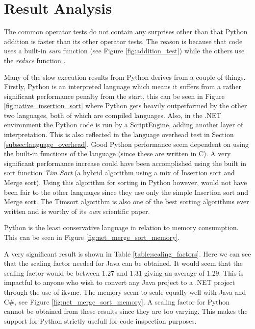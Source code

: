 \section{Result Analysis}

The common operator tests do not contain any surprises other than that Python addition is faster than its other operator tests. The reason is because that code uses a built-in \textit{sum} function \cite{PythonSum} (see Figure \ref{fig:addition_test}) while the others use the \textit{reduce} function \cite{PythonReduce}.

Many of the slow execution results from Python derives from a couple of things. Firstly, Python is an interpreted language which means it suffers from a rather significant performance penalty from the start, this can be seen in Figure \ref{fig:native_insertion_sort} where Python gets heavily outperformed by the other two languages, both of which are compiled languages. Also, in the .NET environment the Python code is run by a ScriptEngine, adding another layer of interpretation. This is also reflected in the language overhead test in Section \ref{subsec:language_overhead}. Good Python performance seem dependent on using the built-in functions of the language (since these are written in C). A very significant performance increase could have been accomplished using the built in sort function \textit{Tim Sort} \cite{PythonSort} (a hybrid algorithm using a mix of Insertion sort and Merge sort). Using this algorithm for sorting in Python however, would not have been fair to the other languages since they use only the simple Insertion sort and Merge sort. The Timsort algorithm is also one of the best sorting algorithms ever written and is worthy of its \textit{own} scientific paper.

Python is the least conservative language in relation to memory consumption. This can be seen in Figure \ref{fig:net_merge_sort_memory}.

A very significant result is shown in Table \ref{table:scaling_factors}. Here we can see that the scaling factor needed for Java can be obtained. It would seem that the scaling factor would be between 1.27 and 1.31 giving an average of 1.29. This is impactful to anyone who wish to convert any Java project to a .NET project through the use of ikvmc. The memory seem to scale equally well with Java and C\#, see Figure \ref{fig:net_merge_sort_memory}. A scaling factor for Python cannot be obtained from these results since they are too varying. This makes the support for Python strictly usefull for code inspection purposes.
